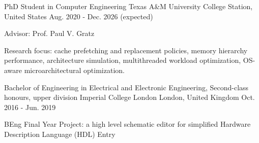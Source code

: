 
\begin{cventries}
\cventry
    {PhD Student in Computer Engineering} %
    {Texas A\&M University} %
    {College Station, United States} %
    {Aug. 2020 - Dec. 2026 (expected)} %
    {
      \begin{cvitems} %
         \item {Advisor: Prof. Paul V. Gratz}
         \item {Research focus: cache prefetching and replacement policies, memory hierarchy performance, architecture simulation, multithreaded workload optimization, OS-aware microarchitectural optimization.}
      \end{cvitems}
    }
  \cventry
    {Bachelor of Engineering in Electrical and Electronic Engineering, Second-class honours, upper division} %
    {Imperial College London} %
    {London, United Kingdom} %
    {Oct. 2016 - Jun. 2019} %
    {
      \begin{cvitems} %
         \item {BEng Final Year Project: a high level schematic editor for simplified Hardware Description Language (HDL) Entry}
      \end{cvitems}
    }
\end{cventries}
